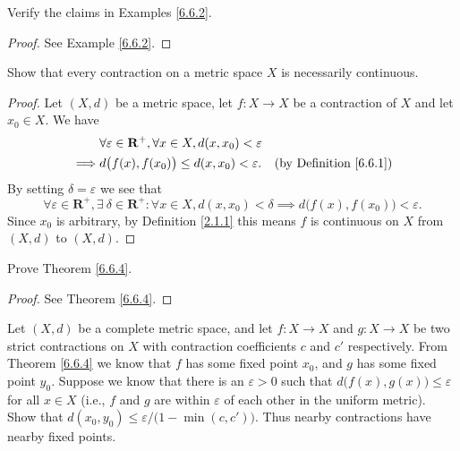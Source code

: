 \begin{exercise}\label{ex 6.6.5}
    Verify the claims in Examples \ref{6.6.2}.
\end{exercise}

\begin{proof}
    See Example \ref{6.6.2}.
\end{proof}

\begin{exercise}\label{ex 6.6.6}
    Show that every contraction on a metric space \(X\) is necessarily continuous.
\end{exercise}

\begin{proof}
    Let \((X, d)\) be a metric space, let \(f : X \to X\) be a contraction of \(X\) and let \(x_0 \in X\).
    We have
    \begin{align*}
                 & \forall \varepsilon \in \mathbf{R}^+, \forall x \in X, d(x, x_0) < \varepsilon                                      \\
        \implies & d\big(f(x), f(x_0)\big) \leq d(x, x_0) < \varepsilon.                          & \text{(by Definition \ref{6.6.1})}
    \end{align*}
    By setting \(\delta = \varepsilon\) we see that
    \[
        \forall \varepsilon \in \mathbf{R}^+, \exists\ \delta \in \mathbf{R}^+ : \forall x \in X, d(x, x_0) < \delta \implies d\big(f(x), f(x_0)\big) < \varepsilon.
    \]
    Since \(x_0\) is arbitrary, by Definition \ref{2.1.1} this means \(f\) is continuous on \(X\) from \((X, d)\) to \((X, d)\).
\end{proof}

\begin{exercise}\label{ex 6.6.7}
    Prove Theorem \ref{6.6.4}.
\end{exercise}

\begin{proof}
    See Theorem \ref{6.6.4}.
\end{proof}

\begin{exercise}\label{ex 6.6.8}
    Let \((X, d)\) be a complete metric space, and let \(f : X \to X\) and \(g : X \to X\) be two strict contractions on \(X\) with contraction coefficients \(c\) and \(c'\) respectively.
    From Theorem \ref{6.6.4} we know that \(f\) has some fixed point \(x_0\), and \(g\) has some fixed point \(y_0\).
    Suppose we know that there is an \(\varepsilon > 0\) such that \(d\big(f(x), g(x)\big) \leq \varepsilon\) for all \(x \in X\)
    (i.e., \(f\) and \(g\) are within \(\varepsilon\) of each other in the uniform metric).
    Show that \(d(x_0, y_0) \leq \varepsilon / \big(1 - \min(c, c')\big)\).
    Thus nearby contractions have nearby fixed points.
\end{exercise}

